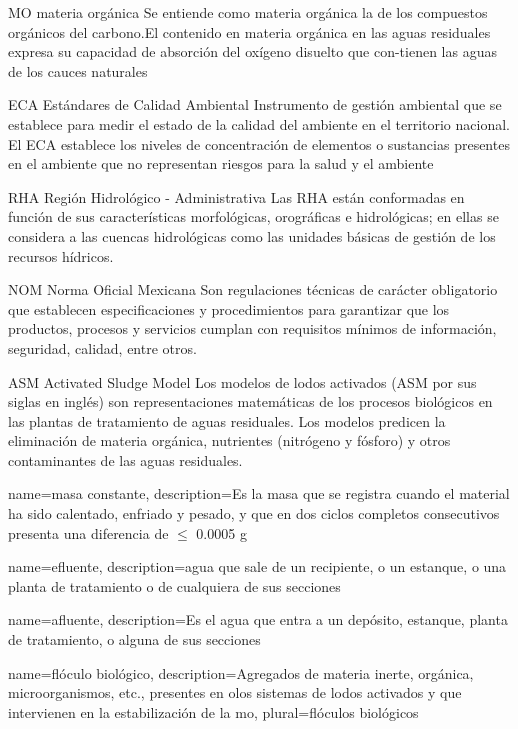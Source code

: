 	{MO}
	{materia orgánica}
	{Se entiende como materia orgánica la de los compuestos orgánicos del carbono.El contenido en materia orgánica en las aguas residuales expresa su capacidad de absorción del oxígeno disuelto que con-tienen las aguas de los cauces naturales}

	{ECA}
	{Estándares de Calidad Ambiental}
	{Instrumento de gestión ambiental que se establece para medir el estado de la calidad del ambiente en el territorio nacional. El ECA establece los niveles de concentración de elementos o sustancias presentes en el ambiente que no representan riesgos para la salud y el ambiente}

	{RHA}
	{Región Hidrológico - Administrativa}
	{Las RHA están conformadas en función de sus características morfológicas, orográficas e hidrológicas; en ellas se considera a las cuencas hidrológicas como las unidades básicas de gestión de los recursos hídricos.}
	
	{NOM}
	{Norma Oficial Mexicana}
	{Son regulaciones técnicas de carácter obligatorio que establecen especificaciones y procedimientos para garantizar que los productos, procesos y servicios cumplan con requisitos mínimos de información, seguridad, calidad, entre otros.}
	
	{ASM}
	{Activated Sludge Model}
	{Los modelos de lodos activados (ASM por sus siglas en inglés) son representaciones matemáticas de los procesos biológicos en las plantas de tratamiento de aguas residuales. Los modelos predicen la eliminación de materia orgánica, nutrientes (nitrógeno y fósforo) y otros contaminantes de las aguas residuales.}

{
	name={masa constante},
	description={Es la masa que se registra cuando el material ha sido calentado, enfriado y pesado, y que en dos ciclos completos consecutivos presenta una diferencia de $\leq$ 0.0005 g}
}

{
	name={efluente},
	description={agua que sale de un recipiente, o un estanque, o una planta de tratamiento o de cualquiera de sus secciones}
}

{
	name=afluente,
	description={Es el agua que entra a un depósito, estanque, planta de tratamiento, o alguna de sus secciones}
}

{
	name={flóculo biológico},
	description={Agregados de materia inerte, orgánica, microorganismos, etc., presentes en olos sistemas de lodos activados y que intervienen en la estabilización de la \gls{mo}},
	plural={flóculos biológicos}
}





